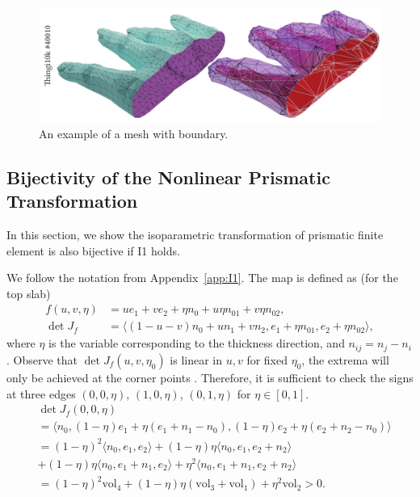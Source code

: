 \begin{figure}
    \centering
    \includegraphics[width=0.9\linewidth]{prism-tex/figs/open-hand}
    \caption{An example of a mesh with boundary.}
    \label{prism:fig:open-hand}
    
\end{figure}



\subsection{Bijectivity of the Nonlinear Prismatic Transformation}
\label{app:bilinear}
In this section, we show
the isoparametric transformation of prismatic finite element \cite{ciarlet1991basic} is also bijective if I1 holds.

We follow the notation from {Appendix~\ref{app:I1}.} 
The map is defined as (for the top slab)
\begin{align*}
    f(u,v,\eta) &= u e_1 + v e_2  + \eta n_0 + u \eta {n_{01}} +
    v \eta {n_{02}},\\
    \det J_f &=  \langle (1-u-v) n_0 + u n_1 + v n_2, e_1 + \eta {n_{01}},
    e_2 + \eta {n_{02} \rangle,}
\end{align*}
where $\eta$ is the variable corresponding to the thickness direction{, and $n_{ij} = n_j - n_i$.}
Observe that $\det J_f(u,v,\eta_0)$ is linear in $u,v$ for fixed $\eta_0$, the extrema will only be achieved at the corner points \cite{knabner2001invertibility}. Therefore, it is sufficient to check the signs at three edges
$(0,0,\eta)$, $(1,0,\eta)$, $(0,1,\eta)$ for $\eta \in [0,1]$.
\begin{align*}
    & \det J_f(0,0,\eta) \\
    &= \langle n_0, (1-\eta)e_1 +\eta (e_1 + n_1 - n_0),(1-\eta)e_2 +\eta (e_2 + n_2 - n_0) \rangle \\
    &= (1-\eta)^2\langle n_0, e_1, e_2 \rangle + 
    (1-\eta)\eta \langle n_0,e_1, e_2+n_2\rangle \\&+ 
    (1-\eta)\eta \langle n_0, e_1+n_1, e_2\rangle + 
    \eta^2\langle n_0, e_1+n_1, e_2 + n_2\rangle\\
    &= (1-\eta)^2 \text{vol}_4 + (1-\eta)\eta (\text{vol}_3 +\text{vol}_1) + \eta^2 \text{vol}_2 > 0.
\end{align*}

